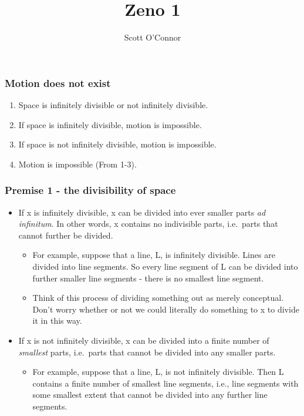 \documentclass[]{article}
\title{Zeno 1}
\author{Scott O'Connor}
\begin{document}
\maketitle

\subsubsection{Motion does not exist}\label{motion-does-not-exist}

\begin{enumerate}
\def\labelenumi{\arabic{enumi}.}
\item
  Space is infinitely divisible or not infinitely divisible.
\item
  If space is infinitely divisible, motion is impossible.
\item
  If space is not infinitely divisible, motion is impossible.
\item
  Motion is impossible (From 1-3).
\end{enumerate}

\subsubsection{Premise 1 - the divisibility of
space}\label{premise-1---the-divisibility-of-space}

\begin{itemize}
\item
  If x is infinitely divisible, x can be divided into ever smaller parts
  \emph{ad infinitum}. In other words, x contains no indivisible parts,
  i.e.~parts that cannot further be divided.

  \begin{itemize}
  \item
    For example, suppose that a line, L, is infinitely divisible. Lines
    are divided into line segments. So every line segment of L can be
    divided into further smaller line segments - there is no smallest
    line segment.
  \item
    Think of this process of dividing something out as merely
    conceptual. Don't worry whether or not we could literally do
    something to x to divide it in this way.
  \end{itemize}
\item
  If x is not infinitely divisible, x can be divided into a finite
  number of \emph{smallest} parts, i.e.~parts that cannot be divided
  into any smaller parts.

  \begin{itemize}
  \itemsep1pt\parskip0pt
  \item
    For example, suppose that a line, L, is not infinitely divisible.
    Then L contains a finite number of smallest line segments, i.e.,
    line segments with some smallest extent that cannot be divided into
    any further line segments.
  \end{itemize}
\end{itemize}
\end{document}
